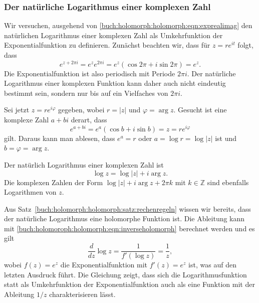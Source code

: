 %
%
\subsubsection{Der natürliche Logarithmus einer komplexen Zahl}
Wir versuchen, ausgehend von
\eqref{buch:holomorph:holomorph:eqn:exprealimag}
den natürlichen Logarithmus einer komplexen Zahl als Umkehrfunktion
der Exponentialfunktion zu definieren.
Zunächst beachten wir, dass für $z=re^{it}$ folgt, dass
\begin{equation}
e^{z+2\pi i}
=
e^z
e^{2\pi i}
=
e^z(\cos 2\pi + i \sin 2\pi)
=
e^z.
\label{buch:holomorph:holomorph:eqn:expperiodisch}
\end{equation}
Die Exponentialfunktion ist also periodisch mit Periode $2\pi i$.
Der natürliche Logarithmus einer komplexen Funktion kann daher auch nicht
eindeutig bestimmt sein, sondern nur bis auf ein Vielfaches von 
$2\pi i$.

Sei jetzt $z = re^{i\varphi}$ gegeben, wobei $r=|z|$ und
$\varphi=\operatorname{arg}z$.
Gesucht ist eine komplexe Zahl $a+bi$ derart, dass
\[
e^{a+bi}
=
e^a(\cos b + i \sin b)
=
z
=
re^{i\varphi}
\]
gilt.
Daraus kann man ablesen, dass $e^a = r$ oder $a = \log r = \log |z|$
ist und $b = \varphi = \operatorname{arg}z$.

\begin{definition}
%
%
Der natürlich Logarithmus einer komplexen Zahl ist
\[
\log z
=
\log |z| + i\operatorname{arg}z.
\]
Die komplexen Zahlen der Form
$\log |z| + i\operatorname{arg}z + 2\pi k$ mit $k\in\mathbb{Z}$
sind ebenfalls Logarithmen von $z$.
%
\end{definition}

Aus Satz~\ref{buch:holomorph:holomorph:satz:rechenregeln}
wissen wir bereits, dass der natürliche Logarithmus eine holomorphe
Funktion ist.
Die Ableitung kann mit \eqref{buch:holomoroph:holomorph:eqn:inverseholomorph}
berechnet werden und es gilt
\begin{equation}
\frac{d}{dz}\log z
=
\frac{1}{f'(\log z)}
=
\frac1{z},
\label{buch:holomorph:holomorph:eqn:logz}
\end{equation}
wobei $f(z)=e^z$ die Exponentialfunktion mit $f'(z)=e^z$ ist, was auf
den letzten Ausdruck führt.
Die Gleichung zeigt, dass sich die Logarithmusfunktion statt als
Umkehrfunktion der Exponentialfunktion auch als eine Funktion
mit der Ableitung $1/z$ charakterisieren lässt.

